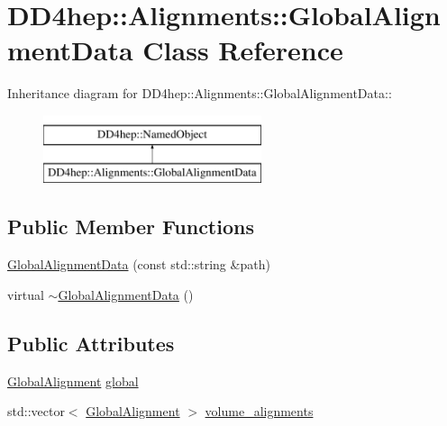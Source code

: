 \hypertarget{class_d_d4hep_1_1_alignments_1_1_global_alignment_data}{
\section{DD4hep::Alignments::GlobalAlignmentData Class Reference}
\label{class_d_d4hep_1_1_alignments_1_1_global_alignment_data}
}
Inheritance diagram for DD4hep::Alignments::GlobalAlignmentData::\begin{figure}[H]
\begin{center}
\leavevmode
\includegraphics[height=2cm]{class_d_d4hep_1_1_alignments_1_1_global_alignment_data}
\end{center}
\end{figure}
\subsection*{Public Member Functions}
\begin{DoxyCompactItemize}
\item 
\hyperlink{class_d_d4hep_1_1_alignments_1_1_global_alignment_data_a57af2014192d0c3f26c8b47b7963236a}{GlobalAlignmentData} (const std::string \&path)
\item 
virtual \hyperlink{class_d_d4hep_1_1_alignments_1_1_global_alignment_data_aa835825012b4775e2cd9d6f286271533}{$\sim$GlobalAlignmentData} ()
\end{DoxyCompactItemize}
\subsection*{Public Attributes}
\begin{DoxyCompactItemize}
\item 
\hyperlink{class_d_d4hep_1_1_alignments_1_1_global_alignment}{GlobalAlignment} \hyperlink{class_d_d4hep_1_1_alignments_1_1_global_alignment_data_a353b81eec4fa99a0ed451a513a2dcc54}{global}
\item 
std::vector$<$ \hyperlink{class_d_d4hep_1_1_alignments_1_1_global_alignment}{GlobalAlignment} $>$ \hyperlink{class_d_d4hep_1_1_alignments_1_1_global_alignment_data_aaebd00327713124764b580f33523cdd5}{volume\_\-alignments}
\end{DoxyCompactItemize}


